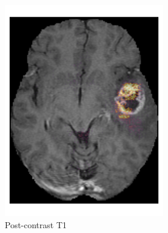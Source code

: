 \begin{figure}[htbp]
\begin{subfigure}[b]{\textwidth}
\begin{subfigure}[b]{0.24\textwidth}
        \includegraphics[width=\textwidth]{Figures/saliency_HGG_T1GD.png}
        \caption*{Post-contrast \acrshort{T1}}
        \end{subfigure}
        \hfill
        \begin{subfigure}[b]{0.24\textwidth}

\end{subfigure}
\end{subfigure}
\end{figure}
